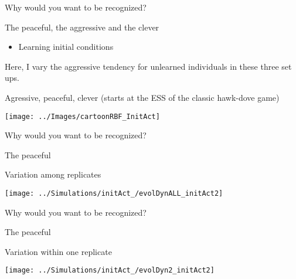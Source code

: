 \documentclass[
  ignorenonframetext,
]{beamer}
\providecommand{\tightlist}{%
  \setlength{\itemsep}{0pt}\setlength{\parskip}{0pt}}
\begin{document}
\begin{frame}{Why would you want to be recognized?}
\protect\hypertarget{why-would-you-want-to-be-recognized}{}

\pause

\begin{block}{The peaceful, the aggressive and the clever}

\begin{itemize}
\tightlist
\item
  Learning initial conditions
\end{itemize}

\tiny

Here, I vary the aggressive tendency for unlearned individuals in these
three set ups.

Agressive, peaceful, clever (starts at the ESS of the classic hawk-dove
game)

\begin{flushleft}\texttt{[image: ../Images/cartoonRBF\_InitAct]} \end{flushleft}

\end{block}

\end{frame}

\begin{frame}{Why would you want to be recognized?}
\protect\hypertarget{why-would-you-want-to-be-recognized-1}{}

\begin{block}{The peaceful}

Variation among replicates

\begin{flushleft}\texttt{[image: ../Simulations/initAct\_/evolDynALL\_initAct2]} \end{flushleft}

\end{block}

\end{frame}

\begin{frame}{Why would you want to be recognized?}
\protect\hypertarget{why-would-you-want-to-be-recognized-2}{}

\begin{block}{The peaceful}

Variation within one replicate

\begin{flushleft}\texttt{[image: ../Simulations/initAct\_/evolDyn2\_initAct2]} \end{flushleft}

\end{block}

\end{frame}
\end{document}
